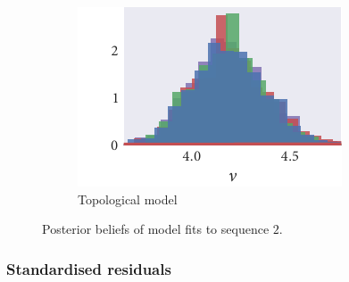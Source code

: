\begin{figure}[p]
\begin{subfigure}[b]{\textwidth}
    \includegraphics{seq2/top_hist_nu.pdf}%
    \caption{Topological model}
  \end{subfigure}
  \caption{Posterior beliefs of model fits to sequence $2$.}
\end{figure}

\subsubsection{Standardised residuals}

